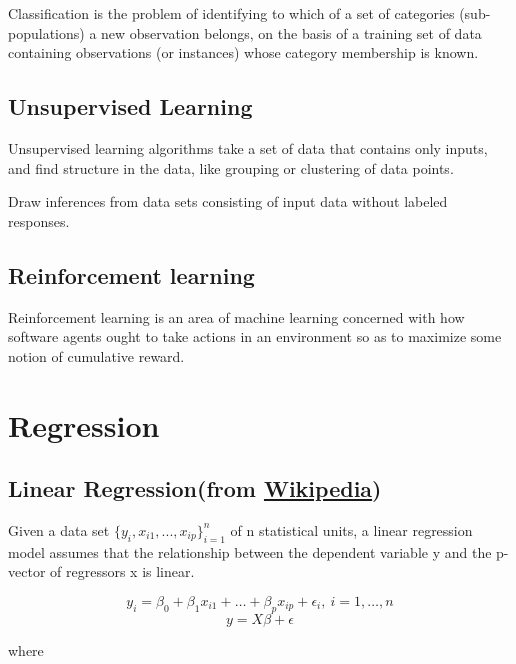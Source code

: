 \documentclass{article}
\begin{document}
Classification is the problem of identifying to which 
of a set of categories (sub-populations) a new observation 
belongs, on the basis of a training set of data containing 
observations (or instances) whose category membership is known.

\subsection{Unsupervised Learning}

Unsupervised learning algorithms take a set of data that 
contains only inputs, and find structure in the data, like 
grouping or clustering of data points.

Draw inferences from data sets consisting of input 
data without labeled responses.

\subsection{Reinforcement learning}
       
Reinforcement learning is an area of machine learning concerned 
with how software agents ought to take actions in an environment 
so as to maximize some notion of cumulative reward.

\section{Regression}

\subsection{Linear Regression(from \href{https://en.wikipedia.org/wiki/Linear_regression\#:~:text=In\%20statistics\%2C\%20linear\%20regression\%20is,is\%20called\%20simple\%20linear\%20regression.}{Wikipedia})}

Given a data set \(\{y_i, x_{i1}, ..., x_{ip}\}_{i=1}^n\) of n statistical units, a linear regression model assumes that the relationship between the dependent variable y and the p-vector of regressors x is linear.

\[y_i = \beta_0 + \beta_{1}x_{i1} + \dots + \beta_{p}x_{ip} + \epsilon_i, \: i = 1, \dots, n\]
\[y = X\beta + \epsilon\]

where
\end{document}
